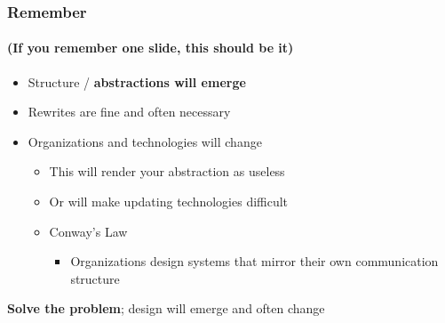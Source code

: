 
\begin{frame}
  \frametitle{Remember}
  \framesubtitle{(If you \textbf{remember} one slide, this should be it)}

  \begin{itemize}
    \pause
    \item Structure / \textbf{abstractions will emerge}
    \pause
    \item Rewrites are fine and often necessary
    \pause
    \item Organizations and technologies will change
      \begin{itemize}
        \item This will render your abstraction as useless
        \item Or will make updating technologies difficult
        \item Conway's Law
          \begin{itemize}
            \item Organizations design systems that mirror their own communication structure
          \end{itemize}
      \end{itemize}
  \end{itemize}

  \pause
  \vspace{1em}
  \textbf{Solve the problem}; design will emerge and often change
\end{frame}
